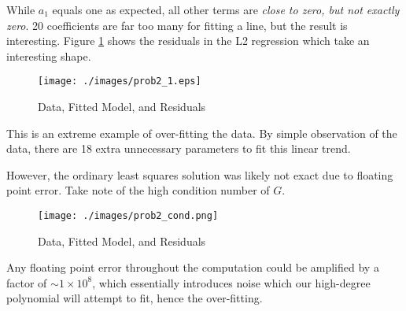 While $a_1$ equals one as expected, all other terms are \textit{close to zero, but not exactly zero}. 20 coefficients are far too many for fitting a line, but the result is interesting. Figure \ref{fig: prob2 residuals} shows the residuals in the L2 regression which take an interesting shape.

\begin{figure}[h] 
	\centering
	\texttt{[image: ./images/prob2\_1.eps]}
	\caption{Data, Fitted Model, and Residuals}
	\label{fig: prob2 residuals}
\end{figure}
\FloatBarrier

This is an extreme example of over-fitting the data. By simple observation of the data, there are 18 extra unnecessary parameters to fit this linear trend. 

However, the ordinary least squares solution was likely not exact due to floating point error. Take note of the high condition number of $G$. 

\begin{figure}[h] 
	\centering
	\texttt{[image: ./images/prob2\_cond.png]}
	\caption{Data, Fitted Model, and Residuals}
	\label{fig: prob2 rcond}
\end{figure}
\FloatBarrier

Any floating point error throughout the computation could be amplified by a factor of $\sim 1 \times 10^{8}$, which essentially introduces noise which our high-degree polynomial will attempt to fit, hence the over-fitting.


